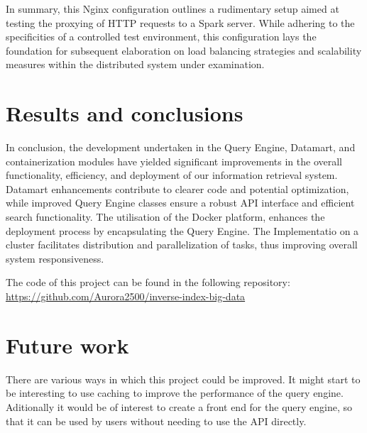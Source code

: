 \documentclass{article}
\begin{document}
In summary, this Nginx configuration outlines a rudimentary setup aimed at testing the proxying of HTTP requests to a Spark server. While adhering to the specificities of a controlled test environment, this configuration lays the foundation for subsequent elaboration on load balancing strategies and scalability measures within the distributed system under examination.

\section{Results and conclusions}

In conclusion, the development undertaken in the Query Engine, Datamart, and containerization modules have yielded significant improvements in the overall functionality, efficiency, and deployment of our information retrieval system. Datamart enhancements contribute to clearer code and potential optimization, while improved Query Engine classes ensure a robust API interface and efficient search functionality. The utilisation of the Docker platform, enhances the deployment process by encapsulating the Query Engine.
The Implementatio on a cluster facilitates distribution and parallelization of tasks, thus improving overall system responsiveness.

The code of this project can be found in the following repository: \url{https://github.com/Aurora2500/inverse-index-big-data}

\section{Future work}

There are various ways in which this project could be improved.
It might start to be interesting to use caching to improve the performance of the query engine.
Aditionally it would be of interest to create a front end for the query engine, so that it can be used by users without needing to use the API directly.
\end{document}
